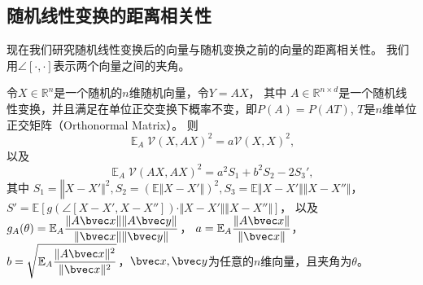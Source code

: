 \subsection{随机线性变换的距离相关性}
现在我们研究随机线性变换后的向量与随机变换之前的向量的距离相关性。
我们用$\angle[\cdot, \cdot]$表示两个向量之间的夹角。
\begin{theorem}
\label{thm:ss-perm:linear-dcov}
    令$X\in \mathbb R^n$是一个随机的$n$维随机向量，令$Y = AX$，
    其中 $A \in \mathbb R^{n \times d}$是一个随机线性变换，并且满足在单位正交变换下概率不变，即$P(A) = P(AT)$, $T$是$n$维单位正交矩阵（Orthonormal Matrix）。
    则
    \begin{equation}
    \label{eq:ss-perm:linear-dcov1}
            \mathop{\mathbb E}_A \mathcal{V}(X, AX)^2 = a\mathcal{V}(X, X)^2,
    \end{equation}
    以及    
    \begin{equation}
    \label{eq:ss-perm:linear-dcov2}
        \mathop{\mathbb E}_A \mathcal{V}(AX, AX)^2 = {a^2S_1 + b^2S_2 - 2S_3'},
    \end{equation}
    其中 $S_1 = \mathbb \Vert X - X'\Vert^2, S_2 = \left( \mathbb E \Vert X - X'\Vert \right)^2, S_3 = \mathbb E \Vert X - X' \Vert \Vert X - X'' \Vert$，\\
    $S' = \mathbb E \left[ g(\angle [X - X', X - X'']) \cdot \Vert X - X'\Vert \Vert X - X'' \Vert \right]$，
    以及
    $g_A(\theta) = \mathbb E_A \dfrac{\Vert A\bvec x \Vert \Vert A\bvec y \Vert}{\Vert \bvec x \Vert \Vert \bvec y \Vert} $，
    $a = \mathbb E_A \dfrac{\Vert A\bvec x \Vert}{\Vert \bvec x \Vert}$，
    $b = \sqrt{\mathbb E_A \dfrac{\Vert A\bvec x \Vert^2}{\Vert \bvec x \Vert^2}}$，$\bvec x, \bvec y$为任意的$n$维向量，且夹角为$\theta$。
\end{theorem}
